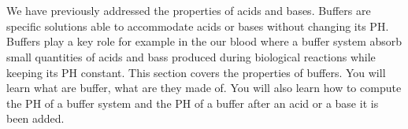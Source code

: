 \documentclass[main.tex]{subfiles}
\begin{document}
\section{\color{blue!30!black}{Buffer solutions}}
We have previously addressed the properties of acids and bases. Buffers are specific solutions able to accommodate acids or bases without changing its PH. Buffers play a key role for example in the our blood where a buffer system absorb small quantities of acids and bass produced during biological reactions while keeping its PH constant. This section covers the properties of buffers. You will learn what are buffer, what are they made of. You will also learn how to compute the PH of a buffer system and the PH of a buffer after an acid or a base it is been added.
\sloppy
\end{document}
